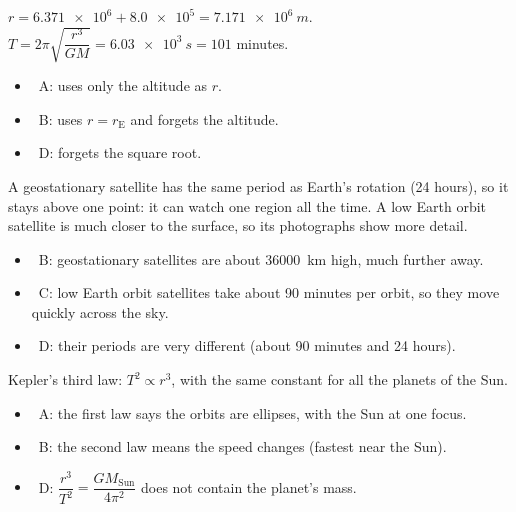 \documentclass[12pt]{article}
\begin{document}
\begin{practiceanswers}
\begin{practiceans}
  $r = \num{6.371e6} + \num{8.0e5} = \qty{7.171e6}{m}$.
  $T = 2\pi\sqrt{\dfrac{r^3}{GM}} = \qty{6.03e3}{s} = 101$ minutes.
  \begin{itemize}
    \item \xmark\ A: uses only the altitude as $r$.
    \item \xmark\ B: uses $r = r_\mathrm{E}$ and forgets the altitude.
    \item \xmark\ D: forgets the square root.
  \end{itemize}
\end{practiceans}

\begin{practiceans}
  A geostationary satellite has the same period as Earth's rotation (24 hours), so it stays above
  one point: it can watch one region all the time. A low Earth orbit satellite is much closer to
  the surface, so its photographs show more detail.
  \begin{itemize}
    \item \xmark\ B: geostationary satellites are about \qty{36000}{km} high, much further away.
    \item \xmark\ C: low Earth orbit satellites take about 90 minutes per orbit, so they move quickly
          across the sky.
    \item \xmark\ D: their periods are very different (about 90 minutes and 24 hours).
  \end{itemize}
\end{practiceans}

\begin{practiceans}
  Kepler's third law: $T^2 \propto r^3$, with the same constant for all the planets of the Sun.
  \begin{itemize}
    \item \xmark\ A: the first law says the orbits are ellipses, with the Sun at one focus.
    \item \xmark\ B: the second law means the speed changes (fastest near the Sun).
    \item \xmark\ D: $\dfrac{r^3}{T^2} = \dfrac{GM_\mathrm{Sun}}{4\pi^2}$ does not contain the planet's
          mass.
  \end{itemize}
\end{practiceans}


\end{practiceanswers}
\end{document}
